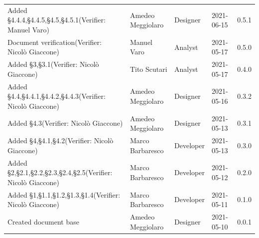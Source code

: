 \documentclass[a4paper]{article}
\begin{document}
\begin{center}
\begin{table}[h!]
\begin{tabular}{p{150px} p{90px} p{80px} p{60px} p{45px}}
            Added \S{4.4.4},\S{4.4.5},\S{4.5},\S{4.5.1}\newline(Verifier: Manuel Varo)             & Amedeo Meggiolaro & Designer       & 2021-06-15    & 0.5.1            \\
            Document verification\newline(Verifier: Nicolò Giaccone)                               & Manuel Varo       & Analyst       & 2021-05-17    & 0.5.0            \\
            Added \S{3},\S{3.1}\newline(Verifier: Nicolò Giaccone)                                 & Tito Scutari      & Analyst       & 2021-05-17    & 0.4.0            \\
            Added \S{4.4},\S{4.4.1},\S{4.4.2},\S{4.4.3}\newline(Verifier: Nicolò Giaccone)         & Amedeo Meggiolaro & Designer       & 2021-05-16    & 0.3.2            \\
            Added \S{4.3}\newline(Verifier: Nicolò Giaccone)                                       & Amedeo Meggiolaro & Designer       & 2021-05-13    & 0.3.1            \\
            Added \S{4},\S{4.1},\S{4.2}\newline(Verifier: Nicolò Giaccone)                         & Marco Barbaresco  & Developer     & 2021-05-13    & 0.3.0            \\
            Added \S{2},\S{2.1},\S{2.2},\S{2.3},\S{2.4},\S{2.5}\newline(Verifier: Nicolò Giaccone) & Marco Barbaresco  & Developer     & 2021-05-12    & 0.2.0            \\
            Added \S{1},\S{1.1},\S{1.2},\S{1.3},\S{1.4}\newline(Verifier: Nicolò Giaccone)         & Marco Barbaresco  & Developer     & 2021-05-11    & 0.1.0            \\
            Created document base                                                                  & Amedeo Meggiolaro & Designer       & 2021-05-10    & 0.0.1            \\
        \end{tabular}
    \end{table}
\end{center}

\newpage
\tableofcontents
\newpage
\newpage
\listoffigures
\newpage






\end{document}
